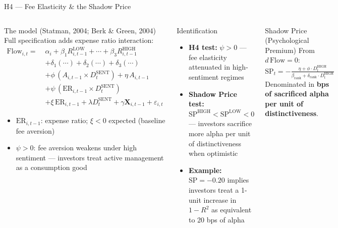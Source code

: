\documentclass[aspectratio=169,10pt]{beamer}
\begin{document}
\begin{frame}{H4 — Fee Elasticity \& the Shadow Price}
\begin{columns}[T]
\begin{block}{The model (Statman, 2004; Berk \& Green, 2004)}
{\footnotesize Full specification adds expense ratio interaction:}
{\footnotesize
\begin{align*}
\mathrm{Flow}_{i,t} = \;&\alpha_i + \beta_1 R^{\mathrm{LOW}}_{i,t-1} + \cdots + \beta_3 R^{\mathrm{HIGH}}_{i,t-1} \\
&+ \delta_1(\cdots) + \delta_2(\cdots) + \delta_3(\cdots) \\
&+ \phi\,(A_{i,t-1} \times D^{\mathrm{SENT}}_t) + \eta\,A_{i,t-1} \\
&+ \psi\,(\mathrm{ER}_{i,t-1} \times D^{\mathrm{SENT}}_t) \\
&+ \xi\,\mathrm{ER}_{i,t-1} + \lambda D^{\mathrm{SENT}}_t + \gamma \mathbf{X}_{i,t-1} + \varepsilon_{i,t}
\end{align*}}
{\footnotesize
\begin{itemize}
  \item $\mathrm{ER}_{i,t-1}$: expense ratio; $\xi < 0$ expected (baseline fee aversion)
  \item $\psi > 0$: fee aversion weakens under high sentiment — investors treat active management as a consumption good
\end{itemize}}
\end{block}

\begin{block}{Identification}
{\footnotesize
\begin{itemize}
  \item \textbf{H4 test:} $\psi > 0$ — fee elasticity attenuated in high-sentiment regimes
  \item \textbf{Shadow Price test:} $\mathrm{SP}^{\mathrm{HIGH}} < \mathrm{SP}^{\mathrm{LOW}} < 0$ — investors sacrifice more alpha per unit of distinctiveness when optimistic
  \item \textbf{Example:} $\mathrm{SP} = -0.20$ implies investors treat a 1-unit increase in $1-R^2$ as equivalent to 20 bps of alpha
\end{itemize}}
\end{block}

\begin{block}{Shadow Price (Psychological Premium)}
{\footnotesize From $d\,\mathrm{Flow} = 0$:
\[ \mathrm{SP}_t = -\tfrac{\eta + \phi \cdot D^{\mathrm{HIGH}}_t}{\beta_{\mathrm{rank}} + \delta_{\mathrm{rank}} \cdot D^{\mathrm{HIGH}}_t} \]
Denominated in \textbf{bps of sacrificed alpha per unit of distinctiveness}.}
\end{block}


\end{columns}
\end{frame}
\end{document}

